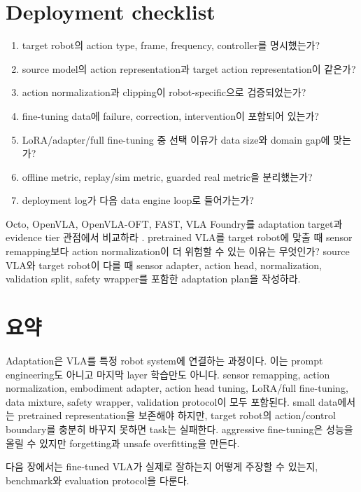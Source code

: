\section{Deployment checklist}

\begin{enumerate}
  \item target robot의 action type, frame, frequency, controller를 명시했는가?
  \item source model의 action representation과 target action representation이 같은가?
  \item action normalization과 clipping이 robot-specific으로 검증되었는가?
  \item fine-tuning data에 failure, correction, intervention이 포함되어 있는가?
  \item LoRA/adapter/full fine-tuning 중 선택 이유가 data size와 domain gap에 맞는가?
  \item offline metric, replay/sim metric, guarded real metric을 분리했는가?
  \item deployment log가 다음 data engine loop로 들어가는가?
\end{enumerate}

\chapterwork
{Octo, OpenVLA, OpenVLA-OFT, FAST, VLA Foundry를 adaptation target과 evidence tier 관점에서 비교하라 \cite{octo2024,openvla2024,openvlaoft2025,fast2025,vlafoundry2026}.}
{pretrained VLA를 target robot에 맞출 때 sensor remapping보다 action normalization이 더 위험할 수 있는 이유는 무엇인가?}
{source VLA와 target robot이 다를 때 sensor adapter, action head, normalization, validation split, safety wrapper를 포함한 adaptation plan을 작성하라.}

\section{요약}

Adaptation은 VLA를 특정 robot system에 연결하는 과정이다. 이는 prompt engineering도 아니고 마지막 layer 학습만도 아니다. sensor remapping, action normalization, embodiment adapter, action head tuning, LoRA/full fine-tuning, data mixture, safety wrapper, validation protocol이 모두 포함된다. small data에서는 pretrained representation을 보존해야 하지만, target robot의 action/control boundary를 충분히 바꾸지 못하면 task는 실패한다. aggressive fine-tuning은 성능을 올릴 수 있지만 forgetting과 unsafe overfitting을 만든다.

다음 장에서는 fine-tuned VLA가 실제로 잘하는지 어떻게 주장할 수 있는지, benchmark와 evaluation protocol을 다룬다.
